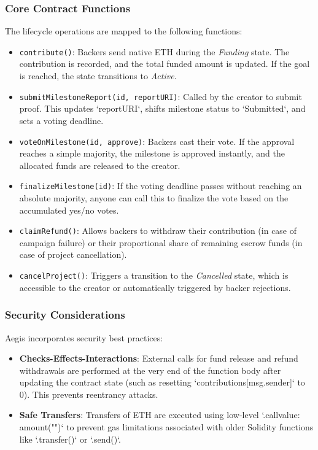 \documentclass[conference]{IEEEtran}
\begin{document}
\subsubsection{Core Contract Functions}
The lifecycle operations are mapped to the following functions:
\begin{itemize}
	\item \texttt{contribute()}: Backers send native ETH during the \textit{Funding} state. The contribution is recorded, and the total funded amount is updated. If the goal is reached, the state transitions to \textit{Active}.
	\item \texttt{submitMilestoneReport(id, reportURI)}: Called by the creator to submit proof. This updates `reportURI`, shifts milestone status to `Submitted`, and sets a voting deadline.
	\item \texttt{voteOnMilestone(id, approve)}: Backers cast their vote. If the approval reaches a simple majority, the milestone is approved instantly, and the allocated funds are released to the creator.
	\item \texttt{finalizeMilestone(id)}: If the voting deadline passes without reaching an absolute majority, anyone can call this to finalize the vote based on the accumulated yes/no votes.
	\item \texttt{claimRefund()}: Allows backers to withdraw their contribution (in case of campaign failure) or their proportional share of remaining escrow funds (in case of project cancellation).
	\item \texttt{cancelProject()}: Triggers a transition to the \textit{Cancelled} state, which is accessible to the creator or automatically triggered by backer rejections.
\end{itemize}

\subsubsection{Security Considerations}
Aegis incorporates security best practices:
\begin{itemize}
	\item \textbf{Checks-Effects-Interactions}: External calls for fund release and refund withdrawals are performed at the very end of the function body after updating the contract state (such as resetting `contributions[msg.sender]` to 0). This prevents reentrancy attacks.
	\item \textbf{Safe Transfers}: Transfers of ETH are executed using low-level `.call{value: amount}("")` to prevent gas limitations associated with older Solidity functions like `.transfer()` or `.send()`.
\end{itemize}
\end{document}
